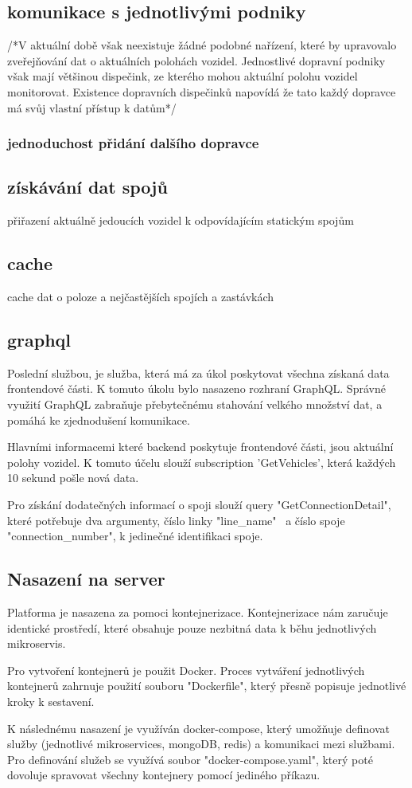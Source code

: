 \subsection {komunikace s jednotlivými podniky}
/*V aktuální době však neexistuje žádné podobné nařízení, které by upravovalo zveřejňování dat o aktuálních polohách vozidel. Jednostlivé dopravní podniky však mají většinou dispečink, ze kterého mohou aktuální polohu vozidel monitorovat. Existence dopravních dispečinků napovídá že tato
každý dopravce má svůj vlastní přístup k datům*/
\subsubsection{jednoduchost přidání dalšího dopravce}
\subsection {získávání dat spojů}
přiřazení aktuálně jedoucích vozidel k odpovídajícím statickým spojům
\subsection {cache}
cache dat o poloze a nejčastějších spojích a zastávkách
\subsection {graphql}
Poslední službou, je služba, která má za úkol poskytovat všechna získaná data frontendové části. K tomuto úkolu bylo nasazeno rozhraní GraphQL. Správné využití GraphQL zabraňuje přebytečnému stahování velkého množství dat, a pomáhá ke zjednodušení komunikace.\par
Hlavními informacemi které backend poskytuje frontendové části, jsou aktuální polohy vozidel. K tomuto účelu slouží subscription 'GetVehicles', která každých 10 sekund pošle nová data.\par
Pro získání dodatečných informací o spoji slouží query "GetConnectionDetail", které potřebuje dva argumenty, číslo linky "line\_name" \
a číslo spoje "connection\_number", k jedinečné identifikaci spoje.\par
\subsection{Nasazení na server}
Platforma je nasazena za pomoci kontejnerizace. Kontejnerizace nám zaručuje identické prostředí, které obsahuje pouze nezbitná data k běhu jednotlivých mikroservis.\par
Pro vytvoření kontejnerů je použit Docker. Proces vytváření jednotlivých kontejnerů zahrnuje použití souboru "Dockerfile", který přesně popisuje jednotlivé kroky k sestavení.\par
K následnému nasazení je využíván docker-compose, který umožňuje definovat služby (jednotlivé mikroservices, mongoDB, redis) a komunikaci mezi službami. Pro definování služeb se využívá soubor "docker-compose.yaml", který poté dovoluje spravovat všechny kontejnery pomocí jediného příkazu.